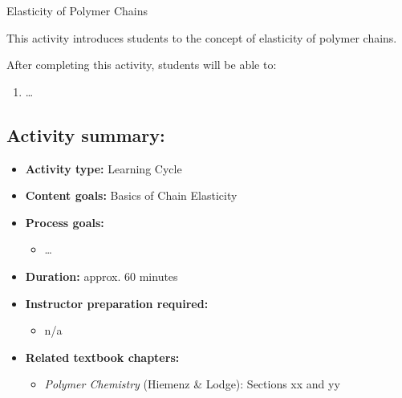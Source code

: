 %
%
%
%

\renewcommand{\figpath}{content/polymphys/chain-confs/chain-elasticity/figs}
\renewcommand{\labelbase}{chain-elasticity}

\begin{activity}{Elasticity of Polymer Chains}

\begin{instructornotes}

	This activity introduces students to the concept of elasticity of polymer chains.
	
	After completing this activity, students will be able to:
			\begin{enumerate}
				\item \dots
			\end{enumerate}
	
			
	\subsection*{Activity summary:}
	\begin{itemize}
		\item \textbf{Activity type:} Learning Cycle
		\item \textbf{Content goals:} Basics of Chain Elasticity
		\item \textbf{Process goals:} %
			\begin{itemize}
				\item \dots
			\end{itemize}
		\item \textbf{Duration:} approx. 60 minutes
		\item \textbf{Instructor preparation required:} 
			\begin{itemize}
				\item n/a
			\end{itemize}
		\item \textbf{Related textbook chapters:}
			\begin{itemize}
				\item \emph{Polymer Chemistry} (Hiemenz \& Lodge): Sections xx and yy
			\end{itemize}
	\end{itemize}


\end{instructornotes}
\end{activity}
